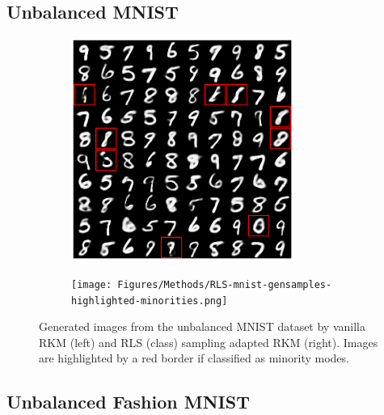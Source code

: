 \subsection{Unbalanced MNIST}

\begin{figure}[H]
    \centering
    \begin{subfigure}{0.45\textwidth}
        \centering
        \includegraphics[width=0.8\textwidth]{Figures/Methods/rkm-mnist-gensamples-highlighted-minorities.png}
    \end{subfigure}
    \hfill
    \begin{subfigure}{0.45\textwidth}
        \centering
        \texttt{[image: Figures/Methods/RLS-mnist-gensamples-highlighted-minorities.png]}
    \end{subfigure}
    \caption{Generated images from the unbalanced MNIST dataset by vanilla RKM (left) and RLS (class) sampling adapted RKM (right). Images are highlighted by a red border if classified as minority modes.}
    \label{fig-gensamples-ubmnist-rls}
\end{figure}


\subsection{Unbalanced Fashion MNIST}

